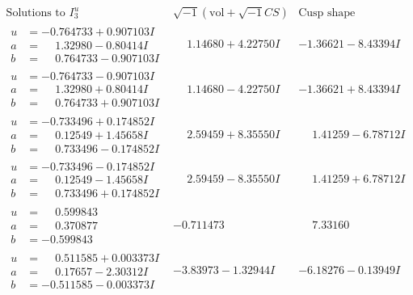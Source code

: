 \documentclass[1p]{elsarticle_modified}
\theoremstyle{definition}
\newcommand{\I}{\sqrt{-1}}
\begin{document}
$$\begin{array}{c|c|c}  
\text{Solutions to }I^u_{3}& \I (\text{vol} + \sqrt{-1}CS) & \text{Cusp shape}\\
 \hline 
\begin{aligned}
u &= -0.764733 + 0.907103 I \\
a &= \phantom{-}1.32980 - 0.80414 I \\
b &= \phantom{-}0.764733 - 0.907103 I\end{aligned}
 & \phantom{-}1.14680 + 4.22750 I & -1.36621 - 8.43394 I \\ \hline\begin{aligned}
u &= -0.764733 - 0.907103 I \\
a &= \phantom{-}1.32980 + 0.80414 I \\
b &= \phantom{-}0.764733 + 0.907103 I\end{aligned}
 & \phantom{-}1.14680 - 4.22750 I & -1.36621 + 8.43394 I \\ \hline\begin{aligned}
u &= -0.733496 + 0.174852 I \\
a &= \phantom{-}0.12549 + 1.45658 I \\
b &= \phantom{-}0.733496 - 0.174852 I\end{aligned}
 & \phantom{-}2.59459 + 8.35550 I & \phantom{-}1.41259 - 6.78712 I \\ \hline\begin{aligned}
u &= -0.733496 - 0.174852 I \\
a &= \phantom{-}0.12549 - 1.45658 I \\
b &= \phantom{-}0.733496 + 0.174852 I\end{aligned}
 & \phantom{-}2.59459 - 8.35550 I & \phantom{-}1.41259 + 6.78712 I \\ \hline\begin{aligned}
u &= \phantom{-}0.599843\phantom{ +0.000000I} \\
a &= \phantom{-}0.370877\phantom{ +0.000000I} \\
b &= -0.599843\phantom{ +0.000000I}\end{aligned}
 & -0.711473\phantom{ +0.000000I} & \phantom{-}7.33160\phantom{ +0.000000I} \\ \hline\begin{aligned}
u &= \phantom{-}0.511585 + 0.003373 I \\
a &= \phantom{-}0.17657 - 2.30312 I \\
b &= -0.511585 - 0.003373 I\end{aligned}
 & -3.83973 - 1.32944 I & -6.18276 - 0.13949 I \\ \hline\begin{aligned}

\end{aligned}
\end{array}$$
\end{document}
